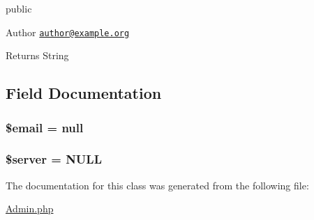 public \begin{DoxyAuthor}{Author}
\href{mailto:author@example.org}{\tt author@example.\+org} 
\end{DoxyAuthor}
\begin{DoxyReturn}{Returns}
String 
\end{DoxyReturn}


\subsection{Field Documentation}
\hypertarget{class_admin_ad634f418b20382e2802f80532d76d3cd}{}
\subsubsection[{\$email}]{\setlength{\rightskip}{0pt plus 5cm}\$email = null}\label{class_admin_ad634f418b20382e2802f80532d76d3cd}
\hypertarget{class_admin_ad135cc8a47e55f0829949cf62214170f}{}
\subsubsection[{\$server}]{\setlength{\rightskip}{0pt plus 5cm}\$server = N\+U\+L\+L}\label{class_admin_ad135cc8a47e55f0829949cf62214170f}


The documentation for this class was generated from the following file\+:\begin{DoxyCompactItemize}
\item 
\hyperlink{_admin_8php}{Admin.\+php}\end{DoxyCompactItemize}
